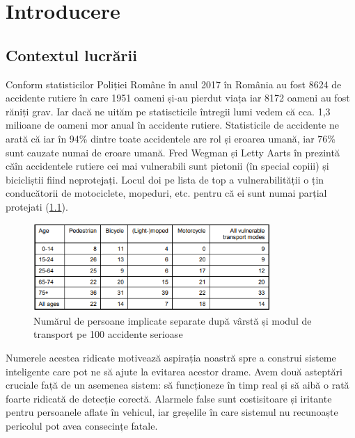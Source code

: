 
\chapter{Introducere}
\label{cap:Introducere}
 \section{Contextul lucrării}
Conform statisticilor Poliției Române \cite{politia_romana}  în anul 2017 în România au fost 8624 de accidente rutiere în care 1951 oameni și-au pierdut viața iar 8172 oameni au fost răniți grav. Iar dacă ne uităm pe statiscticile întregii lumi \cite{WHO}  vedem că cca. 1,3 milioane de oameni mor anual în accidente rutiere.\newline
Statisticile de accidente ne arată că iar în 94\% dintre toate accidentele are rol și eroarea umană, iar 76\% sunt cauzate numai de eroare umană.
 Fred Wegman și Letty Aarts  în \cite{SWOV} prezintă căîn accidentele rutiere cei mai vulnerabili sunt pietonii (în special copiii) și bicicliștii fiind neprotejați. Locul doi pe lista de top a vulnerabilității o țin conducătorii de motociclete, mopeduri, etc. pentru că ei sunt numai parțial protejati (\ref{fig:lethalities}).\newline
\begin{figure}[h!]
    	\centering
	\captionsetup{justification=centering, margin=2cm}
	\includegraphics[width=0.8\textwidth]{figures/lethality_rates.png}
	\caption{Numărul de persoane implicate separate după vârstă și modul de transport pe 100 accidente serioase \cite{SWOV}}
	\label{fig:lethalities}
\end{figure}
Numerele acestea ridicate motivează aspirația noastră spre a construi sisteme inteligente care pot ne să ajute la evitarea acestor drame. Avem două asteptări cruciale față de un asemenea sistem: să funcționeze în timp real și să aibă o rată foarte ridicată de detecție corectă. Alarmele false sunt costisitoare și iritante pentru persoanele aflate în vehicul, iar greșelile în care sistemul nu recunoaște pericolul pot avea consecințe fatale.\newline
